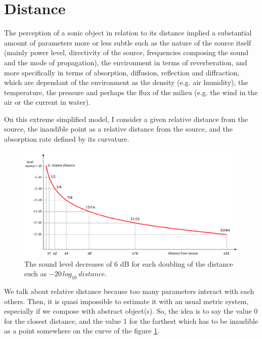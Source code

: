 \documentclass{book}
\begin{document}
\newpage
\section{Distance}
\label{dist}
\makeatletter 
\renewcommand{\thefigure}{\@arabic\c@figure}
\makeatother

\setcounter{figure}{0} 
The perception of a sonic object in relation to its distance implied a substantial amount of parameters more or less subtle such as the nature of the source itself (mainly power level, directivity of the source, frequencies composing the sound and the mode of propagation), the environment in terms of reverberation, and more specifically in terms of absorption, diffusion, reflection and diffraction, which are dependant of the environment as the density (e.g. air humidity), the temperature, the pressure and perhaps the flux of the milieu (e.g. the wind in the air or the current in water). 

\bigskip

On this extreme simplified model, I consider a given relative distance from the source, the inaudible point as a relative distance from the source, and the absorption rate defined by its curvature.

\begin{figure}[H]
\begin{center}
\includegraphics[width=\textwidth]{img/6355}
\caption[]{The sound level decreases of 6 dB for each doubling of the distance such as $-20\,log_{10}\: distance$.
}
\label{fig:dist}
\end{center}
\end{figure}

We talk about relative distance because too many parameters interact with each others. Then, it is quasi impossible to estimate it with an usual metric system, especially if we compose with abstract object(s). So, the idea is to say the value 0 for the closest distance, and the value 1 for the farthest which has to be inaudible as a point somewhere on the curve of the figure \ref{fig:dist}. 
\end{document}
